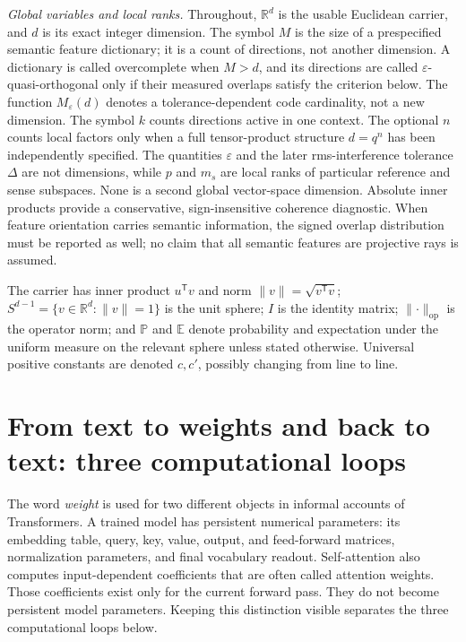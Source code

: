 \documentclass[
  aps,
  reprint,
  superscriptaddress,
  floatfix,
  nofootinbib,
  longbibliography
]{revtex4-2}
\newcommand{\R}{\mathbb{R}}
\newcommand{\E}{\mathbb{E}}
\newcommand{\Prob}{\mathbb{P}}
\newcommand{\Sph}[1]{S^{#1}}
\newcommand{\Msem}{M}
\newcommand{\T}{^{\mathsf{T}}}
\newcommand{\opnorm}[1]{\lVert #1 \rVert_{\mathrm{op}}}
\newcommand{\norm}[1]{\lVert #1 \rVert}
\begin{document}
\emph{Global variables and local ranks.}
Throughout, $\R^{d}$ is the usable Euclidean carrier, and $d$ is its exact
integer dimension.  The symbol $\Msem$ is the size of a prespecified semantic
feature dictionary; it is a count of directions, not another dimension.  A
dictionary is called overcomplete when $\Msem>d$, and its directions are
called $\varepsilon$-quasi-orthogonal only if their measured overlaps satisfy
the criterion below.  The function $M_\varepsilon(d)$ denotes a
tolerance-dependent code cardinality, not a new dimension.  The symbol $k$
counts directions active in one context.  The optional $n$ counts local
factors only when a full tensor-product structure $d=q^n$ has been independently
specified.  The quantities $\varepsilon$ and the later rms-interference
tolerance $\Delta$ are not dimensions, while $p$ and $m_s$ are local ranks of particular
reference and sense subspaces.  None is a second global vector-space
dimension.  Absolute inner products provide a conservative, sign-insensitive
coherence diagnostic.  When feature orientation carries semantic information,
the signed overlap distribution must be reported as well; no claim that all
semantic features are projective rays is assumed.

The carrier has inner product $u\T v$
and norm $\norm{v}=\sqrt{v\T v}$; $\Sph{d-1}=\{v\in\R^{d}:\norm{v}=1\}$
is the unit sphere; $I$ is the identity matrix; $\opnorm{\cdot}$ is the
operator norm; and $\Prob$ and $\E$ denote probability and expectation under the uniform measure on
the relevant sphere unless stated otherwise. Universal positive
constants are denoted $c,c'$, possibly changing from line to line.

\section{From text to weights and back to text: three computational loops}
\label{sec:llm-loops}

The word \emph{weight} is used for two different objects in informal accounts
of Transformers.  A trained model has persistent numerical parameters: its
embedding table, query, key, value, output, and feed-forward matrices,
normalization parameters, and final vocabulary readout.  Self-attention also
computes input-dependent coefficients that are often called attention
weights.  Those coefficients exist only for the current forward pass.  They
do not become persistent model parameters.  Keeping this distinction visible
separates the three computational loops below.
\end{document}
